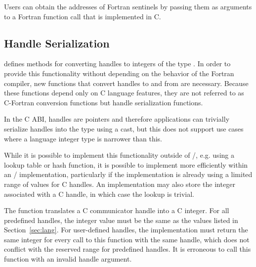 \begin{rationale}
Users can obtain the addresses of Fortran sentinels by passing them as
arguments to a Fortran function call that is implemented in C.
\end{rationale}

\subsection{Handle Serialization}
\label{sec:abi-handleserialization}

 defines
methods for converting handles to integers of the type
.
In order to provide this functionality without depending
on the behavior of the Fortran compiler,
new functions that convert handles to and from
 are necessary.
Because these functions depend only on C language features,
they are not referred to as C-Fortran conversion functions
but handle serialization functions.

In the C ABI, handles are pointers and therefore applications
can trivially serialize handles into the type 
using a cast, but this does not support use cases where a
language integer type is narrower than this.

\begin{rationale}
While it is possible to implement this functionality outside of \MPI/,
e.g. using a lookup table or hash function,
it is possible to implement more efficiently within an \MPI/
implementation, particularly if the implementation is already
using a limited range of values for C handles.
An implementation may also store the integer associated with
a C handle, in which case the lookup is trivial.
\end{rationale}


The function 
translates a C communicator handle into a C integer.
For all predefined handles, the integer value must be
the same as the values listed in Section~\ref{sec:lang}.
For user-defined handles, the implementation must
return the same integer for every call to this function with the same handle,
which does not conflict with the reserved range for predefined handles.
It is erroneous to call this function with an invalid handle argument.


